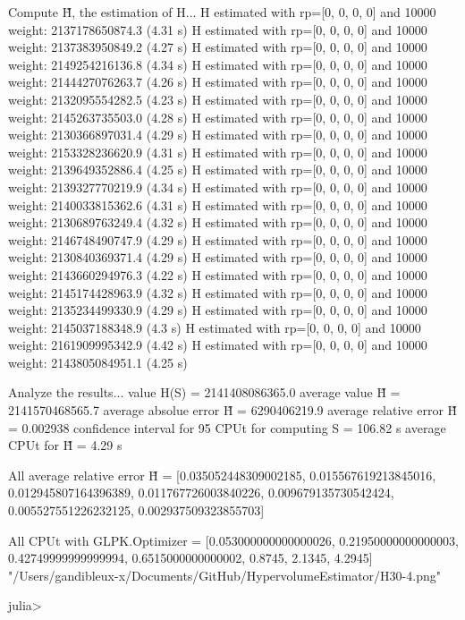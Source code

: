 Compute H̃, the estimation of H...
  H estimated with rp=[0, 0, 0, 0] and 10000 weight:  2137178650874.3  (4.31 s)
  H estimated with rp=[0, 0, 0, 0] and 10000 weight:  2137383950849.2  (4.27 s)
  H estimated with rp=[0, 0, 0, 0] and 10000 weight:  2149254216136.8  (4.34 s)
  H estimated with rp=[0, 0, 0, 0] and 10000 weight:  2144427076263.7  (4.26 s)
  H estimated with rp=[0, 0, 0, 0] and 10000 weight:  2132095554282.5  (4.23 s)
  H estimated with rp=[0, 0, 0, 0] and 10000 weight:  2145263735503.0  (4.28 s)
  H estimated with rp=[0, 0, 0, 0] and 10000 weight:  2130366897031.4  (4.29 s)
  H estimated with rp=[0, 0, 0, 0] and 10000 weight:  2153328236620.9  (4.31 s)
  H estimated with rp=[0, 0, 0, 0] and 10000 weight:  2139649352886.4  (4.25 s)
  H estimated with rp=[0, 0, 0, 0] and 10000 weight:  2139327770219.9  (4.34 s)
  H estimated with rp=[0, 0, 0, 0] and 10000 weight:  2140033815362.6  (4.31 s)
  H estimated with rp=[0, 0, 0, 0] and 10000 weight:  2130689763249.4  (4.32 s)
  H estimated with rp=[0, 0, 0, 0] and 10000 weight:  2146748490747.9  (4.29 s)
  H estimated with rp=[0, 0, 0, 0] and 10000 weight:  2130840369371.4  (4.29 s)
  H estimated with rp=[0, 0, 0, 0] and 10000 weight:  2143660294976.3  (4.22 s)
  H estimated with rp=[0, 0, 0, 0] and 10000 weight:  2145174428963.9  (4.32 s)
  H estimated with rp=[0, 0, 0, 0] and 10000 weight:  2135234499330.9  (4.29 s)
  H estimated with rp=[0, 0, 0, 0] and 10000 weight:  2145037188348.9  (4.3 s)
  H estimated with rp=[0, 0, 0, 0] and 10000 weight:  2161909995342.9  (4.42 s)
  H estimated with rp=[0, 0, 0, 0] and 10000 weight:  2143805084951.1  (4.25 s)

Analyze the results...
  value H(S)                  = 2141408086365.0 
  average value H̃             = 2141570468565.7 
  average absolue error H̃     = 6290406219.9 
  average relative error H̃    = 0.002938 
  confidence interval for 95%
  CPUt for computing S         = 106.82 s
  average CPUt for H̃           = 4.29 s

All average relative error H̃ = [0.035052448309002185, 0.015567619213845016, 0.012945807164396389, 0.011767726003840226, 0.009679135730542424, 0.005527551226232125, 0.002937509323855703]

All CPUt with GLPK.Optimizer = [0.053000000000000026, 0.21950000000000003, 0.42749999999999994, 0.6515000000000002, 0.8745, 2.1345, 4.2945]
"/Users/gandibleux-x/Documents/GitHub/HypervolumeEstimator/H30-4.png"

julia> 